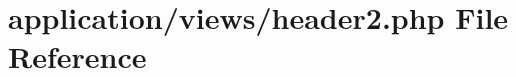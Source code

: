 \hypertarget{header2_8php}{}\section{application/views/header2.php File Reference}
\label{header2_8php}
